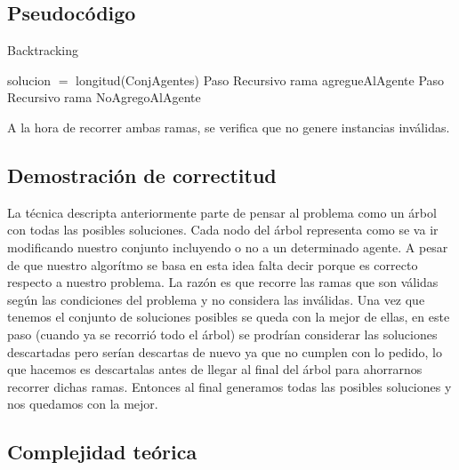 \subsection{Pseudocódigo}

\begin{algorithm}[H]
\caption{Backtracking}\label{Ej1}

\begin{algorithmic}[H]
\State solucion $=$ longitud(ConjAgentes)
\EndIf
\EndIf
{}
\State Paso Recursivo rama agregueAlAgente
\EndIf
{}
\State Paso Recursivo rama NoAgregoAlAgente
\EndIf
\EndProcedure
\end{algorithmic}
\end{algorithm}

	A la hora de recorrer ambas ramas, se verifica que no genere instancias inválidas. 
\subsection{Demostración de correctitud}

	La técnica descripta anteriormente parte de pensar al problema como un árbol con todas las posibles soluciones. Cada nodo del árbol representa como se va ir modificando nuestro conjunto incluyendo o no a un determinado agente. A pesar de que nuestro algorítmo se basa en esta idea falta decir porque es correcto respecto a nuestro problema. La razón es que recorre las ramas que son válidas según las condiciones del problema y no considera las inválidas. Una vez que tenemos el conjunto de soluciones posibles se queda con la mejor de ellas, en este paso (cuando ya se recorrió todo el árbol) se prodrían considerar las soluciones descartadas pero serían descartas de nuevo ya que no cumplen con lo pedido, lo que hacemos es descartalas antes de llegar al final del árbol para ahorrarnos recorrer dichas ramas. Entonces al final generamos todas las posibles soluciones y nos quedamos con la mejor.

\subsection{Complejidad teórica}
	
